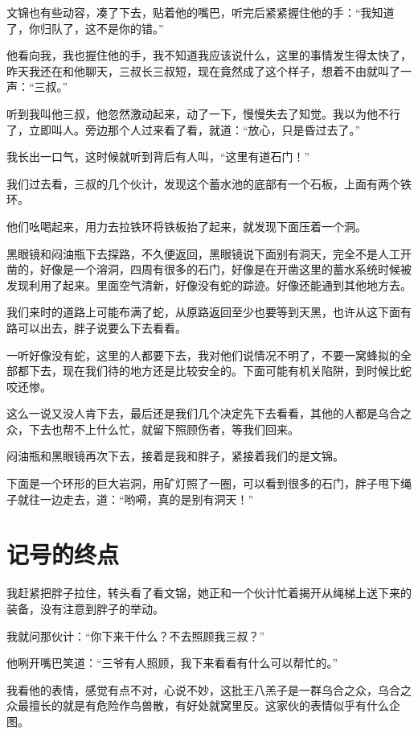 文锦也有些动容，凑了下去，贴着他的嘴巴，听完后紧紧握住他的手：“我知道了，你归队了，这不是你的错。”

他看向我，我也握住他的手，我不知道我应该说什么，这里的事情发生得太快了，昨天我还在和他聊天，三叔长三叔短，现在竟然成了这个样子，想着不由就叫了一声：“三叔。”

听到我叫他三叔，他忽然激动起来，动了一下，慢慢失去了知觉。我以为他不行了，立即叫人。旁边那个人过来看了看，就道：“放心，只是昏过去了。”

我长出一口气，这时候就听到背后有人叫，“这里有道石门！”

我们过去看，三叔的几个伙计，发现这个蓄水池的底部有一个石板，上面有两个铁环。

他们吆喝起来，用力去拉铁环将铁板抬了起来，就发现下面压着一个洞。

黑眼镜和闷油瓶下去探路，不久便返回，黑眼镜说下面别有洞天，完全不是人工开凿的，好像是一个溶洞，四周有很多的石门，好像是在开凿这里的蓄水系统时候被发现利用了起来。里面空气清新，好像没有蛇的踪迹。好像还能通到其他地方去。

我们来时的道路上可能布满了蛇，从原路返回至少也要等到天黑，也许从这下面有路可以出去，胖子说要么下去看看。

一听好像没有蛇，这里的人都要下去，我对他们说情况不明了，不要一窝蜂拟的全部都下去，现在我们待的地方还是比较安全的。下面可能有机关陷阱，到时候比蛇咬还惨。

这么一说又没人肯下去，最后还是我们几个决定先下去看看，其他的人都是乌合之众，下去也帮不上什么忙，就留下照顾伤者，等我们回来。

闷油瓶和黑眼镜再次下去，接着是我和胖子，紧接着我们的是文锦。

下面是一个环形的巨大岩洞，用矿灯照了一圈，可以看到很多的石门，胖子甩下绳子就往一边走去，道：“哟嗬，真的是别有洞天！”

\chapter{记号的终点}

我赶紧把胖子拉住，转头看了看文锦，她正和一个伙计忙着揭开从绳梯上送下来的装备，没有注意到胖子的举动。

我就问那伙计：“你下来干什么？不去照顾我三叔？”

他咧开嘴巴笑道：“三爷有人照顾，我下来看看有什么可以帮忙的。”

我看他的表情，感觉有点不对，心说不妙，这批王八羔子是一群乌合之众，乌合之众最擅长的就是有危险作鸟兽散，有好处就窝里反。这家伙的表情似乎有什么企图。

